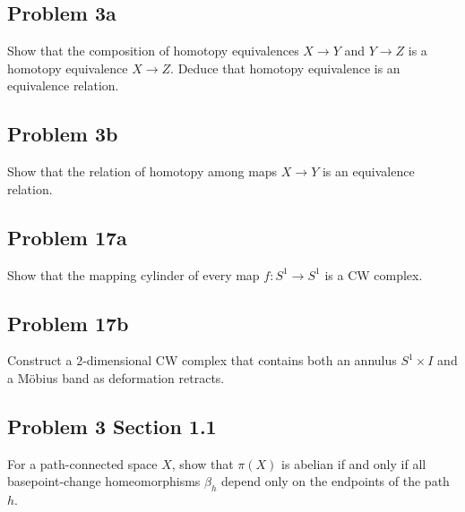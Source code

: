 \subsection{Problem 3a}
\begin{prob}
    Show that the composition of homotopy equivalences $X \to Y$ and $Y \to Z$ is a homotopy equivalence $X \to Z$. Deduce that homotopy equivalence is an equivalence relation.
\end{prob}

\subsection{Problem 3b}
\begin{prob}
    Show that the relation of homotopy among maps $X \to Y$ is an equivalence relation.
\end{prob}

\subsection{Problem 17a}
\begin{prob}
    Show that the mapping cylinder of every map $ f \colon S^{1} \to S^{1}$ is a CW complex.
\end{prob}

\subsection{Problem 17b}
\begin{prob}
    Construct a $2$-dimensional CW complex that contains both an annulus $S^{1}\times I$ and a M\"obius band as deformation retracts.
\end{prob}

\subsection{Problem 3 Section 1.1}
\begin{prob}
    For a path-connected space $X$, show that $\pi\left( X \right) $ is abelian if and only if all basepoint-change homeomorphisms $\beta_h$ depend only on the endpoints of the path $h$.
\end{prob}

